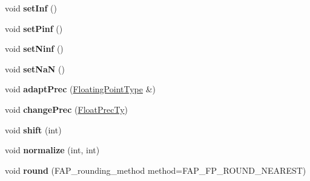 \begin{DoxyCompactItemize}
\hypertarget{classfap_1_1FloatingPointType_a3c29014aadd2e23315b9ebaf76b7c56a}{}\label{classfap_1_1FloatingPointType_a3c29014aadd2e23315b9ebaf76b7c56a} 
void {\bfseries set\+Inf} ()
\item 
\hypertarget{classfap_1_1FloatingPointType_ad4a1f36aae890e6e004092e5d6d9e1f4}{}\label{classfap_1_1FloatingPointType_ad4a1f36aae890e6e004092e5d6d9e1f4} 
void {\bfseries set\+Pinf} ()
\item 
\hypertarget{classfap_1_1FloatingPointType_a7ef3600f368c55d2c26e6102464acbf0}{}\label{classfap_1_1FloatingPointType_a7ef3600f368c55d2c26e6102464acbf0} 
void {\bfseries set\+Ninf} ()
\item 
\hypertarget{classfap_1_1FloatingPointType_af00c1e36d1c917ac204cdfff10605fbf}{}\label{classfap_1_1FloatingPointType_af00c1e36d1c917ac204cdfff10605fbf} 
void {\bfseries set\+NaN} ()
\item 
\hypertarget{classfap_1_1FloatingPointType_a5f8d63229817025e70c8674c3c06c052}{}\label{classfap_1_1FloatingPointType_a5f8d63229817025e70c8674c3c06c052} 
void {\bfseries adapt\+Prec} (\hyperlink{classfap_1_1FloatingPointType}{Floating\+Point\+Type} \&)
\item 
\hypertarget{classfap_1_1FloatingPointType_abdad4f2a38b5764df31d14067e58541e}{}\label{classfap_1_1FloatingPointType_abdad4f2a38b5764df31d14067e58541e} 
void {\bfseries change\+Prec} (\hyperlink{structfap_1_1FloatPrecTy}{Float\+Prec\+Ty})
\item 
\hypertarget{classfap_1_1FloatingPointType_a720c3d8559a7c6639a1242f738ffb598}{}\label{classfap_1_1FloatingPointType_a720c3d8559a7c6639a1242f738ffb598} 
void {\bfseries shift} (int)
\item 
\hypertarget{classfap_1_1FloatingPointType_a09ecdb05d2d6df1c04241896dcf0d815}{}\label{classfap_1_1FloatingPointType_a09ecdb05d2d6df1c04241896dcf0d815} 
void {\bfseries normalize} (int, int)
\item 
\hypertarget{classfap_1_1FloatingPointType_a9398f79f15929853507657140b92f60f}{}\label{classfap_1_1FloatingPointType_a9398f79f15929853507657140b92f60f} 
void {\bfseries round} (F\+A\+P\+\_\+rounding\+\_\+method method=F\+A\+P\+\_\+\+F\+P\+\_\+\+R\+O\+U\+N\+D\+\_\+\+N\+E\+A\+R\+E\+ST)
\end{DoxyCompactItemize}
{\bf }\par
